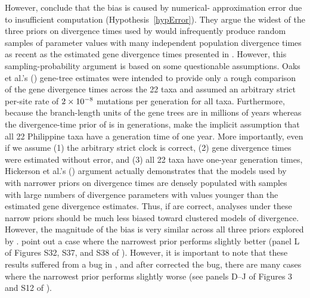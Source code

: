 However, \citet{Hickerson2013} conclude that the bias is caused by numerical-
approximation error due to insufficient computation
(Hypothesis~\ref{hypError}).
They argue the widest of the three priors on divergence times used by
\citet{Oaks2012} would infrequently produce random samples of parameter values
with many independent population divergence times as recent as the estimated
gene divergence times presented in \citet{Oaks2012}.
However, this sampling-probability argument is based on some questionable
assumptions.
Oaks et al.'s (\citeyear{Oaks2012}) gene-tree estimates were intended to
provide only a rough comparison of the gene divergence times across the 22 taxa
and assumed an arbitrary strict per-site rate of $2\times 10^{-8}$ mutations per
generation for all taxa.
Furthermore, because the branch-length units of the gene trees are in millions
of years whereas the divergence-time prior of \msb is in generations,
\citet{Hickerson2013} make the implicit assumption that all 22 Philippine taxa
have a generation time of one year.
More importantly, even if we assume (1) the arbitrary strict clock is correct,
(2) gene divergence times were estimated without error, and (3) all 22 taxa
have one-year generation times, Hickerson et al.'s (\citeyear{Hickerson2013})
argument actually demonstrates that the models used by \citet{Oaks2012} with
narrower priors on divergence times are densely populated with samples with
large numbers of divergence parameters with values younger than the estimated
gene divergence estimates.
Thus, if \citet{Hickerson2013} are correct, analyses under these narrow priors
should be much less biased toward clustered models of divergence.
However, the magnitude of the bias is very similar across all three priors
explored by \citet{Oaks2012}.
\citet{Hickerson2013} point out a case where the narrowest prior performs
slightly better (panel L of Figures S32, S37, and S38 of \citet{Oaks2012}).
However, it is important to note that these results suffered from a bug in
\msb, and after \citet{Oaks2012} corrected the bug, there are many cases where
the narrowest prior performs slightly worse (see panels D--J of Figures 3 and
S12 of \citet{Oaks2012}).

